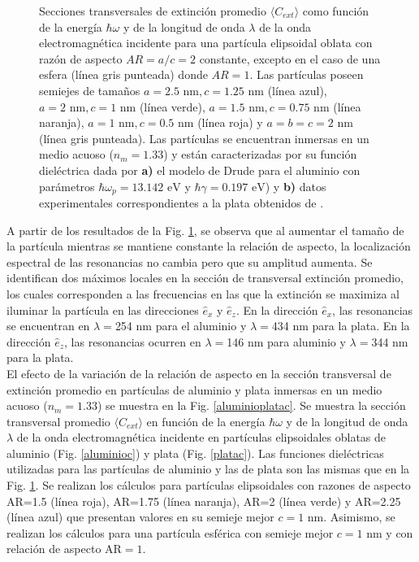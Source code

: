 \begin{figure}[h!]
	\quad%
	\caption{Secciones transversales de extinción promedio $\langle C_{ext}\rangle$ como función de la energía $\hbar\omega$ y de la longitud de onda $\lambda$ de la onda electromagnética incidente para una partícula elipsoidal oblata con razón de aspecto $AR=a/c=2$ constante, excepto en el caso de una esfera (línea gris punteada) donde $AR=1$. Las partículas poseen semiejes de tamaños $a=2.5 \text{ nm}, c=1.25 \text{ nm}$ (línea azul), $a=2 \text{ nm}, c=1 \text{ nm}$ (línea verde), $a=1.5 \text{ nm}, c=0.75 \text{ nm}$ (línea naranja), $a=1 \text{ nm}, c=0.5 \text{ nm}$ (línea roja) y $a=b=c=2\text{ nm}$ (línea gris punteada). Las partículas se encuentran inmersas en un medio acuoso ($n_m=1.33$) y están caracterizadas por su función dieléctrica dada por  \textbf{a)} el modelo de Drude para el aluminio con parámetros $\hbar\omega_p=13.142\text{ eV}$ y $\hbar\gamma=0.197\text{ eV}$) y \textbf{b)} datos experimentales correspondientes a la plata obtenidos de \cite{Plata}. }\label{aluminioplataAR}
\end{figure}
A partir de los resultados de la Fig. \ref{aluminioplataAR}, se observa que al aumentar el tamaño de la partícula mientras se mantiene constante la relación de aspecto, la localización espectral de las resonancias no cambia pero que su amplitud aumenta. Se identifican dos máximos locales en la sección de transversal extinción promedio,  los cuales corresponden a las frecuencias en las que la extinción se maximiza al iluminar la partícula en las direcciones $\hat{e}_x$ y $\hat{e}_z$. En la dirección $\hat{e}_x$, las resonancias  se encuentran en $\lambda=$254 nm para el aluminio y $\lambda=$434 nm para la plata. En la dirección $\hat{e}_z$, las resonancias ocurren en $\lambda=$146 nm para aluminio y $\lambda=$344 nm para la plata. \\

El efecto de la variación de la relación de aspecto en la sección transversal de extinción promedio en partículas de aluminio y plata inmersas en un medio acuoso ($n_m=1.33$) se muestra en la Fig. \ref{aluminioplatac}. Se muestra la sección transversal promedio $\langle C_{ext}\rangle$ en función de la energía $\hbar\omega$ y de la longitud de onda $\lambda$  de la onda electromagnética incidente en partículas elipsoidales oblatas de aluminio (Fig. \ref{aluminioc}) y plata (Fig. \ref{platac}). Las funciones dieléctricas utilizadas para las partículas de aluminio y las de plata son las mismas que en la Fig. \ref{aluminioplataAR}. Se realizan los cálculos para partículas elipsoidales con razones de aspecto AR=1.5 (línea roja), AR=1.75 (línea naranja), AR=2 (línea verde) y AR=2.25 (línea azul) que presentan valores en su semieje mejor $c=1\text{ nm}$. Asimismo, se realizan los cálculos para una partícula esférica con semieje mejor $c=1\text{ nm}$ y con relación de aspecto AR$=1$. 


